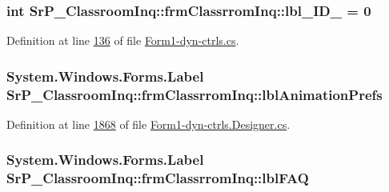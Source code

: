 \hypertarget{class_sr_p___classroom_inq_1_1frm_classrrom_inq_a5d14fbec9e02ebe6942d26ae8ed53d3b}{
\subsubsection[{lbl\-\_\-\-I\-D\-\_\-2}]{\setlength{\rightskip}{0pt plus 5cm}int {\bf \-Sr\-P\-\_\-\-Classroom\-Inq\-::frm\-Classrrom\-Inq\-::lbl\-\_\-\-I\-D\-\_} = 0}}
\label{class_sr_p___classroom_inq_1_1frm_classrrom_inq_a5d14fbec9e02ebe6942d26ae8ed53d3b}


\-Definition at line \hyperlink{_form1-dyn-ctrls_8cs_source_l00136}{136} of file \hyperlink{_form1-dyn-ctrls_8cs_source}{\-Form1-\/dyn-\/ctrls.\-cs}.

\hypertarget{class_sr_p___classroom_inq_1_1frm_classrrom_inq_a3e47dc47a77617c03e8c0347cdc0579b}{
\subsubsection[{lbl\-Animation\-Prefs}]{\setlength{\rightskip}{0pt plus 5cm}\-System.\-Windows.\-Forms.\-Label {\bf \-Sr\-P\-\_\-\-Classroom\-Inq\-::frm\-Classrrom\-Inq\-::lbl\-Animation\-Prefs}}}
\label{class_sr_p___classroom_inq_1_1frm_classrrom_inq_a3e47dc47a77617c03e8c0347cdc0579b}


\-Definition at line \hyperlink{_form1-dyn-ctrls_8_designer_8cs_source_l01868}{1868} of file \hyperlink{_form1-dyn-ctrls_8_designer_8cs_source}{\-Form1-\/dyn-\/ctrls.\-Designer.\-cs}.

\hypertarget{class_sr_p___classroom_inq_1_1frm_classrrom_inq_ab8a84057dad27dc977240ce7f96187c3}{
\subsubsection[{lbl\-F\-A\-Q}]{\setlength{\rightskip}{0pt plus 5cm}\-System.\-Windows.\-Forms.\-Label {\bf \-Sr\-P\-\_\-\-Classroom\-Inq\-::frm\-Classrrom\-Inq\-::lbl\-F\-A\-Q}}}
\label{class_sr_p___classroom_inq_1_1frm_classrrom_inq_ab8a84057dad27dc977240ce7f96187c3}


